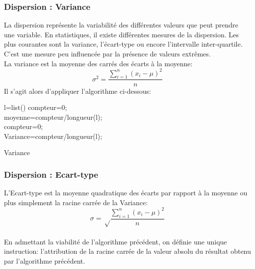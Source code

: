          \subsubsection{Dispersion : Variance}
         La dispersion représente la variabilité des différentes valeurs que peut prendre une variable. En statistiques, il existe différentes mesures de la dispersion. Les plus courantes sont la variance, l'écart-type ou encore l'intervalle inter-quartile. C'est une mesure peu influencée par la présence de valeurs extrêmes.\\
        
        La variance est la moyenne des carrés des écarts à la moyenne:\\
        \[\sigma^2 = \frac{\displaystyle\sum_{i=1}^{n}(x_i - \mu)^2} {n} \]
        Il s'agit alors d'appliquer l'algorithme ci-dessous:\\
        
         \begin{algorithm}[H]
         \SetAlgoLined
          l=list()\;
         compteur=0;\\
         moyenne=compteur/longueur(l);\\
         compteur=0;\\
         Variance=compteur/longueur(l);
         
         
 \caption{Variance}
\end{algorithm}
\subsubsection{Dispersion : Ecart-type}
 L'Ecart-type est la moyenne quadratique des écarts par rapport à la moyenne ou plus simplement la racine carrée de la Variance:\\ \[\sigma = \sqrt\frac{\displaystyle\sum_{i=1}^{n}(x_i - \mu)^2} {n} \]\\
 En admettant la viabilité de l'algorithme précédent, on définie une unique instruction: l'attribution de la racine carrée de la valeur absolu du résultat obtenu par l'algorithme précédent.\\
 

